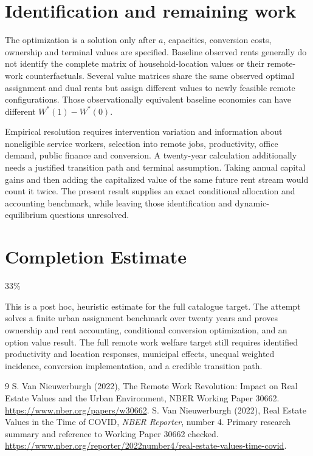 \documentclass[11pt]{article}
\begin{document}
\section*{Identification and remaining work}
The optimization is a solution only after $a$, capacities, conversion costs, ownership and terminal values are specified. Baseline observed rents generally do not identify the complete matrix of household-location values or their remote-work counterfactuals. Several value matrices share the same observed optimal assignment and dual rents but assign different values to newly feasible remote configurations. Those observationally equivalent baseline economies can have different $W^*(1)-W^*(0)$.

Empirical resolution requires intervention variation and information about noneligible service workers, selection into remote jobs, productivity, office demand, public finance and conversion. A twenty-year calculation additionally needs a justified transition path and terminal assumption. Taking annual capital gains and then adding the capitalized value of the same future rent stream would count it twice. The present result supplies an exact conditional allocation and accounting benchmark, while leaving those identification and dynamic-equilibrium questions unresolved.

\section{Completion Estimate}
33\%

This is a post hoc, heuristic estimate for the full catalogue target.
The attempt solves a finite urban assignment benchmark over twenty years and proves ownership and rent accounting, conditional conversion optimization, and an option value result. The full remote work welfare target still requires identified productivity and location responses, municipal effects, unequal weighted incidence, conversion implementation, and a credible transition path.

\begin{thebibliography}{9}
 S. Van Nieuwerburgh (2022), The Remote Work Revolution: Impact on Real Estate Values and the Urban Environment, NBER Working Paper 30662. \url{https://www.nber.org/papers/w30662}.
 S. Van Nieuwerburgh (2022), Real Estate Values in the Time of COVID, \emph{NBER Reporter}, number 4. Primary research summary and reference to Working Paper 30662 checked. \url{https://www.nber.org/reporter/2022number4/real-estate-values-time-covid}.
\end{thebibliography}
\end{document}
